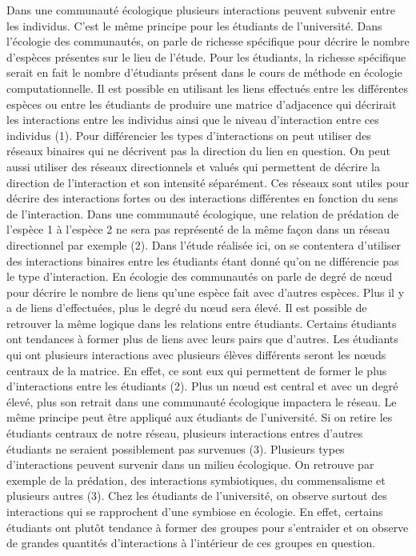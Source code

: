\documentclass[9pt,twocolumn,twoside,]{pnas-new}
\begin{document}
Dans une communauté écologique plusieurs interactions peuvent subvenir
entre les individus. C'est le même principe pour les étudiants de
l'université. Dans l'écologie des communautés, on parle de richesse
spécifique pour décrire le nombre d'espèces présentes sur le lieu de
l'étude. Pour les étudiants, la richesse spécifique serait en fait le
nombre d'étudiants présent dans le cours de méthode en écologie
computationnelle. Il est possible en utilisant les liens effectués entre
les différentes espèces ou entre les étudiants de produire une matrice
d'adjacence qui décrirait les interactions entre les individus ainsi que
le niveau d'interaction entre ces individus (1). Pour différencier les
types d'interactions on peut utiliser des réseaux binaires qui ne
décrivent pas la direction du lien en question. On peut aussi utiliser
des réseaux directionnels et valués qui permettent de décrire la
direction de l'interaction et son intensité séparément. Ces réseaux sont
utiles pour décrire des interactions fortes ou des interactions
différentes en fonction du sens de l'interaction. Dans une communauté
écologique, une relation de prédation de l'espèce 1 à l'espèce 2 ne sera
pas représenté de la même façon dans un réseau directionnel par exemple
(2). Dans l'étude réalisée ici, on se contentera d'utiliser des
interactions binaires entre les étudiants étant donné qu'on ne
différencie pas le type d'interaction. En écologie des communautés on
parle de degré de nœud pour décrire le nombre de liens qu'une espèce
fait avec d'autres espèces. Plus il y a de liens d'effectuées, plus le
degré du nœud sera élevé. Il est possible de retrouver la même logique
dans les relations entre étudiants. Certains étudiants ont tendances à
former plus de liens avec leurs pairs que d'autres. Les étudiants qui
ont plusieurs interactions avec plusieurs élèves différents seront les
nœuds centraux de la matrice. En effet, ce sont eux qui permettent de
former le plus d'interactions entre les étudiants (2). Plus un nœud est
central et avec un degré élevé, plus son retrait dans une communauté
écologique impactera le réseau. Le même principe peut être appliqué aux
étudiants de l'université. Si on retire les étudiants centraux de notre
réseau, plusieurs interactions entres d'autres étudiants ne seraient
possiblement pas survenues (3). Plusieurs types d'interactions peuvent
survenir dans un milieu écologique. On retrouve par exemple de la
prédation, des interactions symbiotiques, du commensalisme et plusieurs
autres (3). Chez les étudiants de l'université, on observe surtout des
interactions qui se rapprochent d'une symbiose en écologie. En effet,
certains étudiants ont plutôt tendance à former des groupes pour
s'entraider et on observe de grandes quantités d'interactions à
l'intérieur de ces groupes en question.
\end{document}
